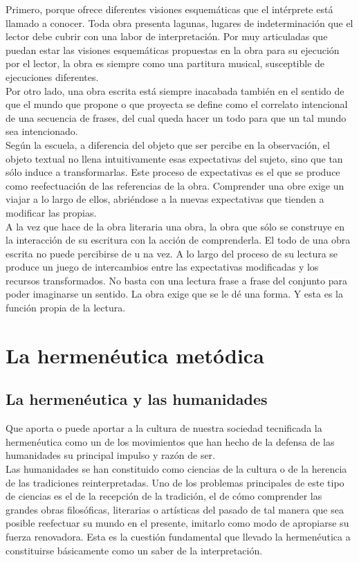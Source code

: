 \documentclass[a4paper, 11pt, twocolumn, spanish]{article}
\begin{document}
Primero, porque ofrece diferentes visiones esquemáticas que el
intérprete está llamado a conocer. Toda obra presenta lagunas, lugares
de indeterminación que el lector debe cubrir con una labor de
interpretación. Por muy articuladas que puedan estar las visiones
esquemáticas propuestas en la obra para su ejecución por el lector, la
obra es siempre como una partitura musical, susceptible de ejecuciones
diferentes.\\[0pt]

Por otro lado, una obra escrita está siempre inacabada también en el
sentido de que el mundo que propone o que proyecta se define como el
correlato intencional de una secuencia de frases, del cual queda hacer
un todo para que un tal mundo sea intencionado.\\[0pt]

Según la escuela, a diferencia del objeto que ser percibe en la
observación, el objeto textual no llena intuitivamente esas
expectativas del sujeto, sino que tan sólo induce a
transformarlas. Este proceso de expectativas es el que se produce como
reefectuación de las referencias de la obra. Comprender una obre exige
un viajar a lo largo de ellos, abriéndose a la nuevas expectativas que
tienden a modificar las propias.\\[0pt]

A la vez que hace de la obra literaria una obra, la obra que sólo se
construye en la interacción de su escritura con la acción de
comprenderla. El todo de una obra escrita no puede percibirse de u na
vez. A lo largo del proceso de su lectura se produce un juego de
intercambios entre las expectativas modificadas y los recursos
transformados. No basta con una lectura frase a frase del conjunto
para poder imaginarse un sentido. La obra exige que se le dé una
forma. Y esta es la función propia de la lectura.


\section{La hermenéutica metódica}
\label{sec:orgaa24ea1}
\subsection{La hermenéutica y las humanidades}
\label{sec:orgc40b1b6}
Que aporta o puede aportar a la cultura de nuestra sociedad
tecnificada la hermenéutica como un de los movimientos que han hecho
de la defensa de las humanidades su principal impulso y razón de
ser.\\[0pt]
Las humanidades se han constituido como ciencias de la cultura o de la
herencia de las tradiciones reinterpretadas. Uno de los problemas
principales de este tipo de ciencias es el de la recepción de la
tradición, el de cómo comprender las grandes obras filosóficas,
literarias o artísticas del pasado de tal manera que sea posible
reefectuar su mundo en el presente, imitarlo como modo de apropiarse
su fuerza renovadora. Esta es la cuestión fundamental que llevado la
hermenéutica a constituirse básicamente como un saber de la
interpretación.\\[0pt]
\end{document}
